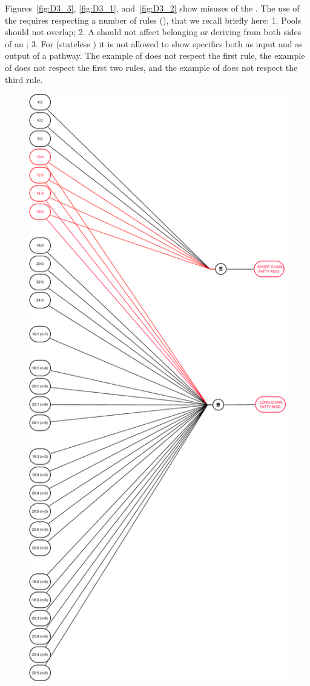 Figures~\ref{fig:D3_3}, \ref{fig:D3_1}, and~\ref{fig:D3_2} show misuses of the .
The use of the  requires respecting a number of rules (), that we recall briefly here: 1. Pools should not overlap; 2. A  should not affect  belonging or deriving from both sides of an ; 3. For  (stateless ) it is not allowed to show specifics both as input and as output of a pathway.
The example of  does not respect the first rule, the example of  does not respect the first two rules, and the example of  does not respect the third rule.

\begin{figure}
\begin{center}
\includegraphics[scale=0.379]{images/build/d3_3_example.pdf}

\end{center}
\end{figure}
